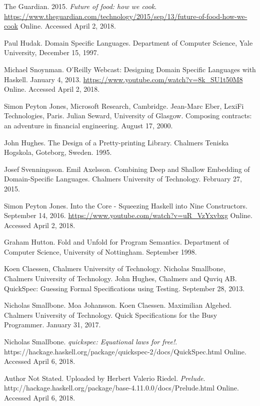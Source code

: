 \documentclass[11pt]{article}
\begin{document}
    \begin{thebibliography}{12}

        The Guardian. 2015. \textit{Future of food: how we cook}.
        \url{https://www.theguardian.com/technology/2015/sep/13/future-of-food-how-we-cook}
        Online. Accessed April 2, 2018.

        Paul Hudak. Domain Specific Languages. Department of Computer
        Science, Yale University, December 15, 1997.

        Michael Snoynman. O'Reilly Webcast: Designing Domain Specific
        Languages with Haskell. January 4, 2013.
        \url{https://www.youtube.com/watch?v=8k_SU1t50M8}
        Online. Accessed April 2, 2018.

        Simon Peyton Jones, Microsoft Research, Cambridge.
        Jean-Marc Eber, LexiFi Technologies, Paris. Julian Seward,
        University of Glasgow. Composing contracts: an adventure in
        financial engineering. August 17, 2000.

        John Hughes. The Design of a Pretty-printing Library.
        Chalmers Teniska Hogskola, Goteborg, Sweden. 1995.

        Josef Svenningsson. Emil Axelsson. Combining Deep and Shallow
        Embedding of Domain-Specific Languages. Chalmers University
        of Technology. February 27, 2015.

        Simon Peyton Jones. Into the Core - Squeezing Haskell into
        Nine Constructors. September 14, 2016.
        \url{https://www.youtube.com/watch?v=uR_VzYxvbxg}
        Online. Accessed April 2, 2018.

        Graham Hutton. Fold and Unfold for Program Semantics. Department of
        Computer Science, University of Nottingham. September 1998.

        Koen Claessen, Chalmers University of Technology. Nicholas Smallbone,
        Chalmers University of Technology. John Hughes, Chalmers and Quviq AB.
        QuickSpec: Guessing Formal Specifications using Testing.
        September 28, 2013.

        Nicholas Smallbone. Moa Johansson. Koen Claessen. Maximilian Algehed.
        Chalmers University of Technology.
        Quick Specifications for the Busy Programmer. January 31, 2017.

        Nicholas Smallbone. \textit{quickspec: Equational laws for free!}.
        https://hackage.haskell.org/package/quickspec-2/docs/QuickSpec.html
        Online. Accessed April 6, 2018.

        Author Not Stated. Uploaded by Herbert Valerio Riedel. \textit{Prelude}.
        http://hackage.haskell.org/package/base-4.11.0.0/docs/Prelude.html
        Online. Accessed April 6, 2018.

    \end{thebibliography}   

    \newpage

    \appendix
\end{document}
